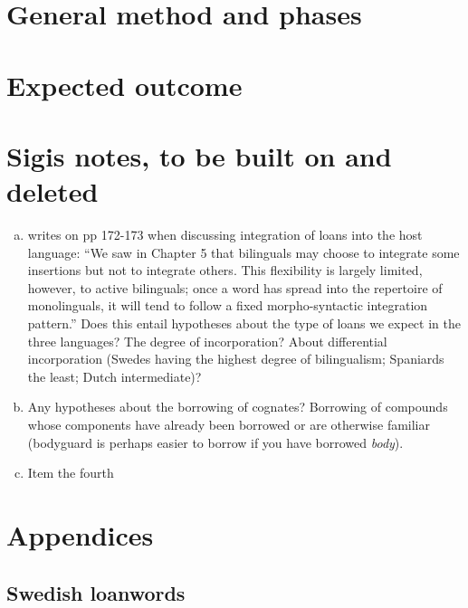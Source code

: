 \documentclass[a4paper]{article}
\begin{document}


\section{General method and phases}




\section{Expected outcome}



\section{Sigis notes, to be built on and deleted}


\begin{enumerate}[a.]
	\item \citet{Matras2009} writes on pp 172-173 when discussing integration of loans into the host language: ``We saw in Chapter 5 that bilinguals may choose to integrate some insertions but not to integrate others. This flexibility is largely limited, however, to active bilinguals; once a word has spread into the repertoire of monolinguals, it will tend to follow a fixed morpho-syntactic integration pattern.'' Does this entail hypotheses about the type of loans we expect in the three languages? The degree of incorporation? About differential incorporation (Swedes having the highest degree of bilingualism; Spaniards the least; Dutch intermediate)?
	\item  Any hypotheses about the borrowing of cognates? Borrowing of compounds whose components have already been borrowed or are otherwise familiar (bodyguard is perhaps easier to borrow if you have borrowed \emph{body}). 
	\item  Item the fourth
\end{enumerate}

\section{Appendices}


\subsection{Swedish loanwords}


{}

\end{document}
